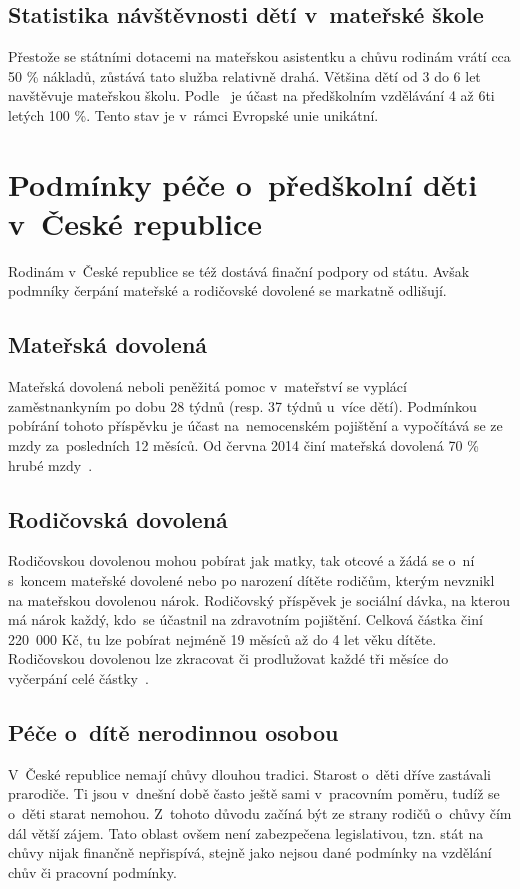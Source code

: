 			\subsection{Statistika návštěvnosti dětí v mateřské škole}
			\label{statistika}
				Přestože se státními dotacemi na mateřskou asistentku a chůvu rodinám vrátí cca 50 \% nákladů, zůstává tato služba relativně drahá. Většina dětí od 3 do 6 let navštěvuje mateřskou školu. Podle~\cite{Eurydice} je účast na předškolním vzdělávání 4 až 6ti letých 100 \%. Tento stav je v~rámci Evropské unie unikátní. 
			

		\section{Podmínky péče o~předškolní děti v~České republice}
		Rodinám v~České republice se též dostává finační podpory od státu. Avšak podmníky čerpání mateřské a rodičovské dovolené se markatně odlišují.

			\subsection{Mateřská dovolená}
				Mateřská dovolená neboli peněžitá pomoc v mateřství se vyplácí zaměstnankyním po dobu 28 týdnů (resp. 37 týdnů u~více dětí). Podmínkou pobírání tohoto příspěvku je účast na nemocenském pojištění a vypočítává se ze mzdy za posledních 12 měsíců. Od června 2014 činí mateřská dovolená 70 \% hrubé mzdy~\citep{materska}.

			\subsection{Rodičovská dovolená}
				Rodičovskou dovolenou mohou pobírat jak matky, tak otcové a žádá se o~ní s koncem mateřské dovolené nebo po narození dítěte rodičům, kterým nevznikl na mateřskou dovolenou nárok. Rodičovský příspěvek je sociální dávka, na kterou má nárok každý, kdo se účastnil na zdravotním pojištění. Celková částka činí 220 000 Kč, tu lze pobírat nejméně 19 měsíců až do 4 let věku dítěte. Rodičovskou dovolenou lze zkracovat či prodlužovat každé tři měsíce do vyčerpání celé částky~\citep{rodicovska}.

			\subsection{Péče o~dítě nerodinnou osobou}
				V~České republice nemají chůvy dlouhou tradici. Starost o~děti dříve zastávali prarodiče. Ti jsou v~dnešní době často ještě sami v~pracovním poměru, tudíž se o~děti starat nemohou. Z~tohoto důvodu začíná být ze strany rodičů o~chůvy čím dál větší zájem. Tato oblast ovšem není zabezpečena legislativou, tzn. stát na chůvy nijak finančně nepřispívá, stejně jako nejsou dané podmínky na vzdělání chův či pracovní podmínky. 


